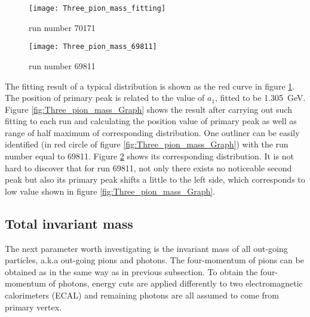 \begin{figure*}[t!]
	\centering
	\begin{subfigure}{0.48\textwidth}
		\texttt{[image: Three\_pion\_mass\_fitting]}
		\caption{run number 70171}
		\label{fig:Three_pion_mass_fitting}
	\end{subfigure}
	\begin{subfigure}{0.48\textwidth}
		\texttt{[image: Three\_pion\_mass\_69811]}
		\caption{run number 69811}
		\label{fig:Three_pion_mass_69811}
	\end{subfigure}
	\caption{Invariant mass distribution of three pions and their corresponding fitting result. The range of fitting corresponds to \SI{30}{\percent} of maximal value of distribution. (a) Distribution of a normal run. The first peak (primary) locates at around \SI{1.3}{\giga\electronvolt}. The fitting curve (red) coincide well with data around primary peak, but poorly around second peak. (b) Distribution of an abnormal run. No second peak can be found on the right side of primary peak. Parameter $a_1$ is fitted to be \SI{1.034}{\giga\electronvolt}, which is slightly larger than correct value due to the bad fitting coincidence. }
	\label{fig:pion_mass}
\end{figure*}



The fitting result of a typical distribution is shown as the red curve in figure \ref{fig:Three_pion_mass_fitting}. The position of primary peak is related to the value of $a_1$, fitted to be \SI{1.305}{\giga\electronvolt}. Figure \ref{fig:Three_pion_mass_Graph} shows the result after carrying out such fitting to each run and calculating the position value of primary peak as well as range of half maximum of corresponding distribution. One outliner can be easily identified (in red circle of figure \ref{fig:Three_pion_mass_Graph}) with the run number equal to 69811. Figure \ref{fig:Three_pion_mass_69811} shows its corresponding distribution. It is not hard to discover that for run 69811, not only there exists no noticeable second peak but also its primary peak shifts a little to the left side, which corresponds to low value shown in figure \ref{fig:Three_pion_mass_Graph}.
\subsection{Total invariant mass}
The next parameter worth investigating is the invariant mass of all out-going particles, a.k.a out-going pions and photons. The four-momentum of pions can be obtained as in the same way as in previous subsection. To obtain the four-momentum of photons, energy cuts are applied differently to two electromagnetic calorimeters (ECAL) and remaining photons are all assumed to come from primary vertex.
